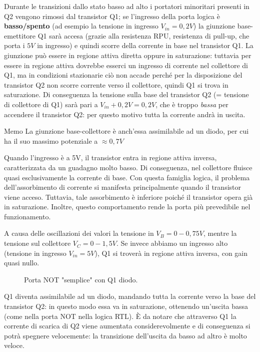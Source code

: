 \documentclass[
]{book}
\begin{document}
Durante le transizioni dallo stato basso ad alto i portatori minoritari
presenti in Q2 vengono rimossi dal transistor Q1; se l'ingresso della
porta logica è \textbf{basso/spento} (ad esempio la tensione in ingresso
\(V_{in}=0,2V\)) la giunzione base-emettitore Q1 sarà accesa (grazie
alla resistenza RPU, resistenza di pull-up, che porta i \(5V\) in
ingresso) e quindi scorre della corrente in base nel transistor Q1. La
giunzione può essere in regione attiva diretta oppure in saturazione:
tuttavia per essere in regione attiva dovrebbe esserci un ingresso di
corrente nel collettore di Q1, ma in condizioni stazionarie ciò non
accade perché per la disposizione del transistor Q2 non scorre corrente
verso il collettore, quindi Q1 si trova in saturazione. Di conseguenza
la tensione sulla base del transistor Q2 (= tensione di collettore di
Q1) sarà pari a \(V_{in}+0,2V=0,2V\), che è troppo \emph{bassa} per
accendere il transistor Q2: per questo motivo tutta la corrente andrà in
uscita.

\begin{greenbox}{Memo}
La giunzione base-collettore è anch'essa assimilabile ad un diodo, per cui ha il suo massimo potenziale a $\approx 0,7V$
\end{greenbox}

Quando l'ingresso è a 5V, il transistor entra in regione attiva inversa,
caratterizzata da un guadagno molto basso. Di conseguenza, nel
collettore fluisce quasi esclusivamente la corrente di base. Con questa
famiglia logica, il problema dell'assorbimento di corrente si manifesta
principalmente quando il transistor viene acceso. Tuttavia, tale
assorbimento è inferiore poiché il transistor opera già in saturazione.
Inoltre, questo comportamento rende la porta più prevedibile nel
funzionamento.

A causa delle oscillazioni dei valori la tensione in \(V_{B}=0-0,75V\),
mentre la tensione sul collettore \(V_{C}=0-1,5V\). Se invece abbiamo un
ingresso alto (tensione in ingresso \(V_{in}=5V\)), Q1 si troverà in
regione attiva inversa, con gain quasi nullo.

\begin{figure}[H]
    \centering
    \resizebox{0.5\textwidth}{!}{}
    \caption{Porta NOT "semplice" con Q1 diodo.}
\end{figure}

Q1 diventa assimilabile ad un diodo, mandando tutta la corrente verso la
base del transistor Q2: in questo modo essa va in saturazione, ottenendo
un'uscita bassa (come nella porta NOT nella logica RTL). È da notare che
attraverso Q1 la corrente di scarica di Q2 viene aumentata
considerevolmente e di conseguenza si potrà spegnere velocemente: la
transizione dell'uscita da basso ad altro è molto veloce.
\end{document}
